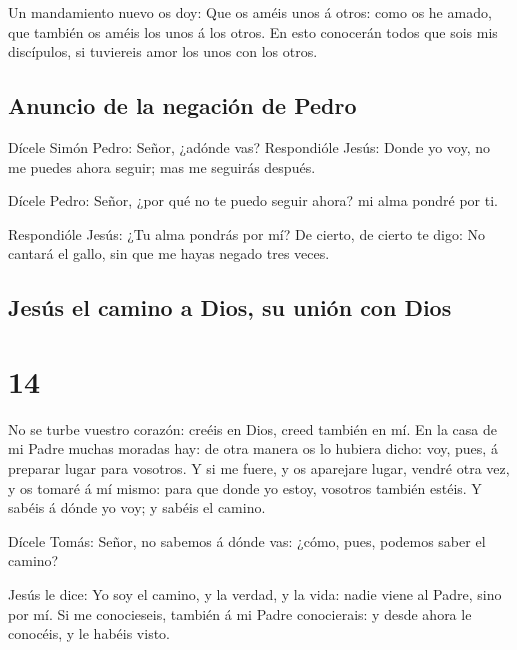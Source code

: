  Un mandamiento nuevo os doy: Que os améis unos á otros:
como os he amado, que también os améis los unos á los otros.
 En esto conocerán todos que sois mis discípulos, si
tuviereis amor los unos con los otros.

\hypertarget{anuncio-de-la-negaciuxf3n-de-pedro}{%
\subsection{Anuncio de la negación de
Pedro}\label{anuncio-de-la-negaciuxf3n-de-pedro}}

 Dícele Simón Pedro: Señor, ¿adónde vas? Respondióle
Jesús: Donde yo voy, no me puedes ahora seguir; mas me seguirás después.

 Dícele Pedro: Señor, ¿por qué no te puedo seguir ahora?
mi alma pondré por ti.

 Respondióle Jesús: ¿Tu alma pondrás por mí? De cierto,
de cierto te digo: No cantará el gallo, sin que me hayas negado tres
veces.

\hypertarget{jesuxfas-el-camino-a-dios-su-uniuxf3n-con-dios}{%
\subsection{Jesús el camino a Dios, su unión con
Dios}\label{jesuxfas-el-camino-a-dios-su-uniuxf3n-con-dios}}

\hypertarget{section-43-14}{%
\section{14}\label{section-43-14}}

 No se turbe vuestro corazón: creéis en Dios, creed
también en mí.  En la casa de mi Padre muchas moradas hay:
de otra manera os lo hubiera dicho: voy, pues, á preparar lugar para
vosotros.  Y si me fuere, y os aparejare lugar, vendré
otra vez, y os tomaré á mí mismo: para que donde yo estoy, vosotros
también estéis.  Y sabéis á dónde yo voy; y sabéis el
camino.

 Dícele Tomás: Señor, no sabemos á dónde vas: ¿cómo, pues,
podemos saber el camino?

 Jesús le dice: Yo soy el camino, y la verdad, y la vida:
nadie viene al Padre, sino por mí.  Si me conocieseis,
también á mi Padre conocierais: y desde ahora le conocéis, y le habéis
visto.

